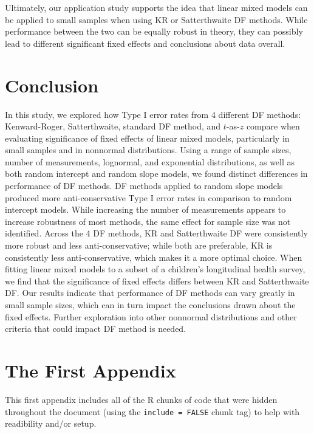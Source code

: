 \documentclass[12pt, twoside]{amherstthesis}
\begin{document}
Ultimately, our application study supports the idea that linear mixed models can be applied to small samples when using KR or Satterthwaite DF methods. While performance between the two can be equally robust in theory, they can possibly lead to different significant fixed effects and conclusions about data overall.

\hypertarget{conclusion-1}{%
\chapter*{Conclusion}\label{conclusion-1}}

In this study, we explored how Type I error rates from 4 different DF methods: Kenward-Roger, Satterthwaite, standard DF method, and \(t\)-as-\(z\) compare when evaluating significance of fixed effects of linear mixed models, particularly in small samples and in nonnormal distributions. Using a range of sample sizes, number of measurements, lognormal, and exponential distributions, as well as both random intercept and random slope models, we found distinct differences in performance of DF methods. DF methods applied to random slope models produced more anti-conservative Type I error rates in comparison to random intercept models. While increasing the number of measurements appears to increase robustness of most methods, the same effect for sample size was not identified. Across the 4 DF methods, KR and Satterthwaite DF were consistently more robust and less anti-conservative; while both are preferable, KR is consistently less anti-conservative, which makes it a more optimal choice. When fitting linear mixed models to a subset of a children's longitudinal health survey, we find that the significance of fixed effects differs between KR and Satterthwaite DF. Our results indicate that performance of DF methods can vary greatly in small sample sizes, which can in turn impact the conclusions drawn about the fixed effects. Further exploration into other nonnormal distributions and other criteria that could impact DF method is needed.

\appendix

\hypertarget{the-first-appendix}{%
\chapter{The First Appendix}\label{the-first-appendix}}

This first appendix includes all of the R chunks of code that were hidden throughout the document (using the \texttt{include\ =\ FALSE} chunk tag) to help with readibility and/or setup.
\end{document}
